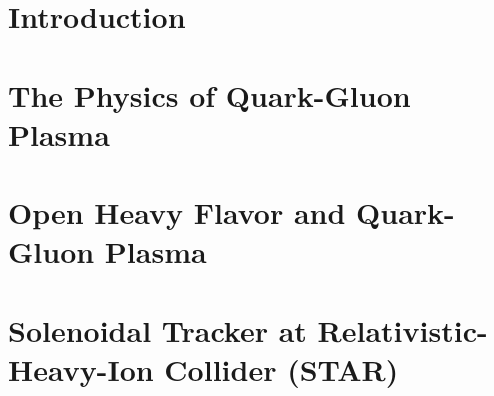 \documentclass[a4paper,titlepage,11pt,twoside,openright]{report} %
\newcommand{\Listofabbrev}{
                           \printnomenclature
                           \newpage
                          }
\newcommand{\Lambdac}{\ensuremath{{\Lambda_\text{c}}}}
\begin{document}
\thispagestyle{fancy}
\renewcommand{\footrulewidth}{0.4pt}


% 


\newpage
% 

\listoffigures
\listoftables
\tableofcontents 
\pagestyle{fancy}
\fancyhead{} %
\fancyhead[RE]{\rightmark}
\fancyhead[LO]{\leftmark}

\renewcommand{\footrulewidth}{0.4pt}
\cleardoublepage
{}
{}
\setcounter{page}{1}

\Listofabbrev \newpage
\cleardoublepage
\chapter{Introduction}



\cleardoublepage
\chapter{The Physics of Quark-Gluon Plasma}



\cleardoublepage
\chapter{Open Heavy Flavor and Quark-Gluon Plasma}




\cleardoublepage
\chapter{Solenoidal Tracker at Relativistic-Heavy-Ion Collider (STAR)\label{STARchapter}}

\end{document}
